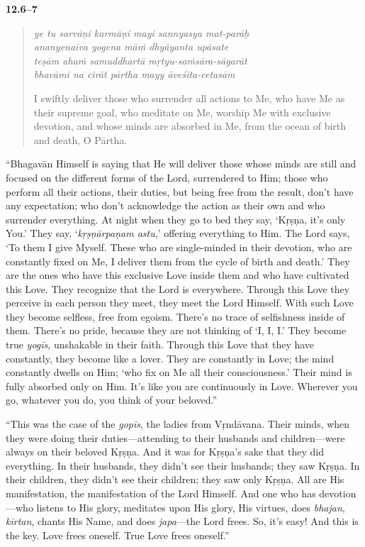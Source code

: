 \par\noindent\textbf{12.6–7}\par
\begin{verse}
\textit{ye tu sarvāṇi karmāṇi mayi sannyasya mat-parāḥ} \\
\textit{ananyenaiva yogena māṁ dhyāyanta upāsate} \\
\textit{teṣām ahaṁ samuddhartā mṛtyu-saṁsāra-sāgarāt} \\
\textit{bhavāmi na cirāt pārtha mayy āveśita-cetasām}

\noindent I swiftly deliver those who surrender all actions to Me, who have Me as their supreme goal, who meditate on Me, worship Me with exclusive devotion, and whose minds are absorbed in Me, from the ocean of birth and death, O Pārtha.
\end{verse}
\par


\enquote{Bhagavān Himself is saying that He will deliver those whose minds are still and focused on the different forms of the Lord, surrendered to Him; those who perform all their actions, their duties, but being free from the result, don’t have any expectation; who don’t acknowledge the action as their own and who surrender everything. At night when they go to bed they say, \enquote{Kṛṣṇa, it’s only You.} They say, \enquote{\textit{kṛṣṇārpaṇam astu},} offering everything to Him. The Lord says, \enquote{To them I give Myself. These who are single-minded in their devotion, who are constantly fixed on Me, I deliver them from the cycle of birth and death.} They are the ones who have this exclusive Love inside them and who have cultivated this Love. They recognize that the Lord is everywhere. Through this Love they perceive in each person they meet, they meet the Lord Himself. With such Love they become selfless, free from egoism. There’s no trace of selfishness inside of them. There’s no pride, because they are not thinking of \enquote{I, I, I.} They become true \textit{yogīs}, unshakable in their faith. Through this Love that they have constantly, they become like a lover. They are constantly in Love; the mind constantly dwells on Him; \enquote{who fix on Me all their consciousness.} Their mind is fully absorbed only on Him. It’s like you are continuously in Love. Wherever you go, whatever you do, you think of your beloved.}

\enquote{This was the case of the \textit{gopīs}, the ladies from Vṛndāvana. Their minds, when they were doing their duties---attending to their husbands and children---were always on their beloved Kṛṣṇa. And it was for Kṛṣṇa's sake that they did everything. In their husbands, they didn’t see their husbands; they saw Kṛṣṇa. In their children, they didn’t see their children; they saw only Kṛṣṇa. All are His manifestation, the manifestation of the Lord Himself. And one who has devotion---who listens to His glory, meditates upon His glory, His virtues, does \textit{bhajan}, \textit{kīrtan}, chants His Name, and does \textit{japa}---the Lord frees. So, it’s easy! And this is the key. Love frees oneself. True Love frees oneself.}

